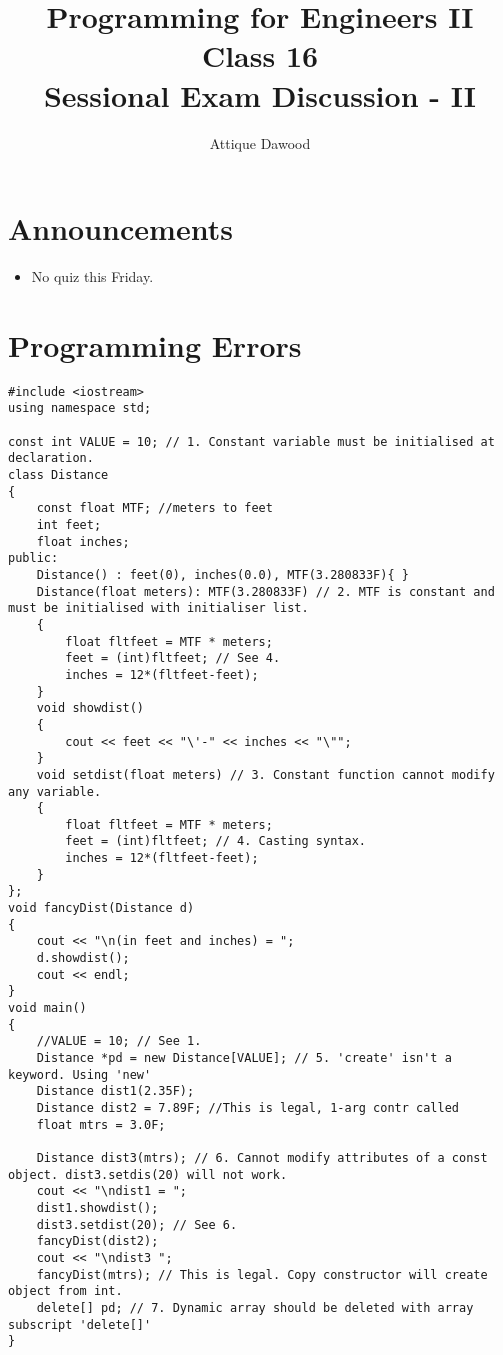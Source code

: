 \documentclass[12pt,a4paper]{article}
\title{\vspace{-2cm}Programming for Engineers II\\Class 16\\Sessional Exam Discussion - II}
\author{Attique Dawood}
\begin{document}
\maketitle
\section{Announcements}
\begin{itemize}
\item No quiz this Friday.
\end{itemize}
\section{Programming Errors}
\begin{lstlisting}
#include <iostream>
using namespace std;

const int VALUE = 10; // 1. Constant variable must be initialised at declaration.
class Distance
{
	const float MTF; //meters to feet
	int feet;
	float inches;
public:
	Distance() : feet(0), inches(0.0), MTF(3.280833F){ }
	Distance(float meters): MTF(3.280833F) // 2. MTF is constant and must be initialised with initialiser list.
	{
		float fltfeet = MTF * meters;
		feet = (int)fltfeet; // See 4.
		inches = 12*(fltfeet-feet);
	}
	void showdist()
	{
		cout << feet << "\'-" << inches << "\"";
	}
	void setdist(float meters) // 3. Constant function cannot modify any variable.
	{
		float fltfeet = MTF * meters;
		feet = (int)fltfeet; // 4. Casting syntax.
		inches = 12*(fltfeet-feet);
	}
};
void fancyDist(Distance d)
{
	cout << "\n(in feet and inches) = ";
	d.showdist();
	cout << endl;
}
void main()
{
	//VALUE = 10; // See 1.
	Distance *pd = new Distance[VALUE]; // 5. 'create' isn't a keyword. Using 'new'
	Distance dist1(2.35F); 
	Distance dist2 = 7.89F;	//This is legal, 1-arg contr called
	float mtrs = 3.0F;

	Distance dist3(mtrs); // 6. Cannot modify attributes of a const object. dist3.setdis(20) will not work.
	cout << "\ndist1 = ";
	dist1.showdist();
	dist3.setdist(20); // See 6.
	fancyDist(dist2);
	cout << "\ndist3 ";
	fancyDist(mtrs); // This is legal. Copy constructor will create object from int.
	delete[] pd; // 7. Dynamic array should be deleted with array subscript 'delete[]'
}
\end{lstlisting}


\end{document}
